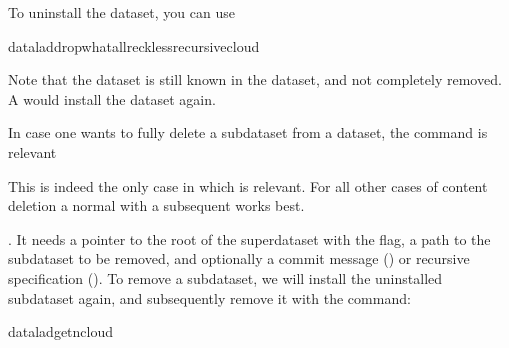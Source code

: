 \sphinxAtStartPar
To uninstall the dataset, you can use

\begin{sphinxVerbatim}[commandchars=\\\{\}]
dataladdrop\PYGZhy{}\PYGZhy{}whatall\PYGZhy{}\PYGZhy{}reckless\PYGZhy{}\PYGZhy{}recursivecloud
\end{sphinxVerbatim}

\sphinxAtStartPar
Note that the dataset is still known in the dataset, and not completely removed.
A  would install the dataset again.

\ignorespaces 
\sphinxAtStartPar
In case one wants to fully delete a subdataset from a dataset, the
 command is relevant%
\begin{footnote}\sphinxAtStartFootnote
This is indeed the only case in which  is
relevant. For all other cases of content deletion a normal 
with a subsequent  works best.
%
\end{footnote}.
It needs a pointer to the root of the superdataset with the 
flag, a path to the subdataset to be removed, and optionally a commit message
() or recursive specification ().
To remove a subdataset, we will install the uninstalled subdataset again, and
subsequently remove it with the  command:

\begin{sphinxVerbatim}[commandchars=\\\{\}]
dataladget\PYGZhy{}ncloud
\end{sphinxVerbatim}

